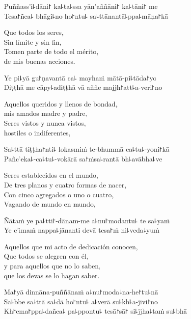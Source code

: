 Puññass'i꜕dāni꜓ ka꜕ta꜕ssa yān'aññāni꜓ ka꜕tāni꜓ me\\
Tesa꜓ñca꜕ bhāgi꜕no ho꜓ntu꜕ sa꜕ttānantā꜕ppa꜕māṇa꜓kā

\begin{english}
	Que todos los seres,\\
	Sin límite y sin fin,\\
	Tomen parte de todo el mérito,\\
	de mis buenas acciones.
\end{english}

Ye pi꜕yā gu꜓ṇavantā ca꜕ mayhaṁ mātā-pi꜕tāda꜓yo\\
Diṭṭhā me cāpy꜕adiṭṭhā vā aññe majjh꜓att꜕a-veri꜓no

\begin{english}
	Aquellos queridos y llenos de bondad,\\
	mis amados madre y padre,\\
	Seres vistos y nunca vistos,\\
	hostiles o indiferentes,
\end{english}

Sa꜕ttā tiṭṭha꜓nti꜕ lokasmiṁ te-bhummā ca꜕tu꜕-yoni꜓kā\\
Pañc'eka꜕-ca꜕tu꜕-vokārā sa꜓ṁsa꜕rantā bh꜕avābha꜕ve

\begin{english}
	Seres establecidos en el mundo,\\
	De tres planos y cuatro formas de nacer,\\
	Con cinco agregados o uno o cuatro,\\
	Vagando de mundo en mundo,
\end{english}

Ñātaṁ ye pa꜕tti꜓-dānam-me a꜕nu꜓modantu꜕ te sa꜕yaṁ\\
Ye c'imaṁ nappa꜕jānanti devā tesa꜓ṁ ni꜕veda꜕yuṁ

\clearpage

\begin{english}
	Aquellos que mi acto de dedicación conocen,\\
	Que todos se alegren con él,\\
	y para aquellos que no lo saben,\\
	que los devas se lo hagan saber.
\end{english}

Ma꜓yā dinnāna-puññānaṁ a꜕nu꜓moda꜕na-he꜓tu꜕nā\\
Sa꜕bbe sa꜕ttā sa꜕dā ho꜓ntu꜕ a꜕verā su꜕kh꜕a-jīvi꜓no\\
Kh꜓ema꜓ppa꜕dañca꜕ pa꜕ppontu꜕ tesā꜓sā꜓ si꜕jjha꜕taṁ su꜕bhā


